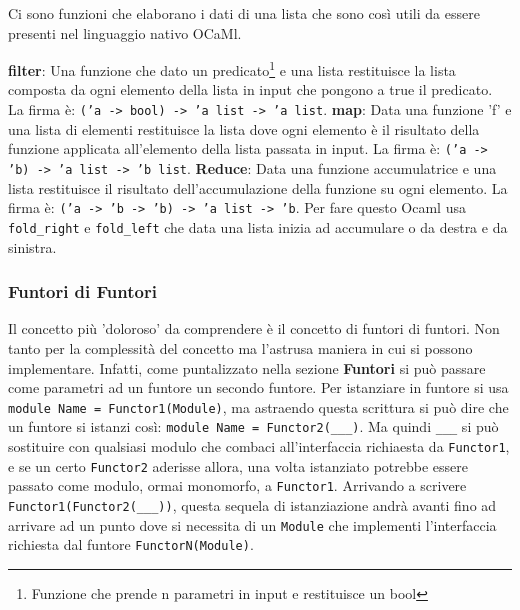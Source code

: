 \documentclass{article}
\begin{document}
\hspace*{0.5cm}Ci sono funzioni che elaborano i dati di una lista che sono così utili da essere presenti nel linguaggio nativo OCaMl.

\vspace*{0.5cm}

\hspace*{0.5cm}\textbf{filter}: Una funzione che dato un predicato\footnote{Funzione che prende n parametri in input e restituisce un bool} e una lista restituisce la lista composta da ogni elemento della lista in input che pongono a true il predicato.
La firma è: \texttt{\>('a -> bool) -> 'a list -> 'a list}.\newline
\hspace*{0.5cm}\textbf{map}: Data una funzione 'f' e una lista di elementi restituisce la lista dove ogni elemento è il risultato della funzione applicata all'elemento della lista passata in input.
La firma è: \texttt{\>('a -> 'b) -> 'a list -> 'b list}.\newline
\hspace*{0.5cm}\textbf{Reduce}: Data una funzione accumulatrice e una lista restituisce il risultato dell'accumulazione della funzione su  ogni elemento.
La firma è: \texttt{\>('a -> 'b -> 'b) -> 'a list -> 'b}.\newline
\hspace*{0.5cm}Per fare questo Ocaml usa \texttt{fold\_right} e \texttt{fold\_left} che data una lista inizia ad accumulare o da destra e da sinistra.

\subsubsection{Funtori di Funtori}

\vspace*{0.5cm}

\hspace*{0.5cm}Il concetto più 'doloroso' da comprendere è il concetto di funtori di funtori. 
Non tanto per la complessità del concetto ma l'astrusa maniera in cui si possono implementare.
Infatti, come puntalizzato nella sezione \textbf{Funtori} si può passare come parametri ad un funtore un secondo funtore.
Per istanziare in funtore si usa \texttt{module Name = Functor1(Module)}, ma astraendo questa scrittura si può dire che un funtore si istanzi così: \texttt{module Name = Functor2(\_\_\_)}.
Ma quindi \texttt{\_\_\_} si può sostituire con qualsiasi modulo che combaci all'interfaccia richiaesta da \texttt{Functor1}, e se un certo \texttt{Functor2} aderisse allora, una volta istanziato potrebbe essere passato come modulo, ormai monomorfo, a \texttt{Functor1}.
Arrivando a scrivere \texttt{Functor1(Functor2(\_\_\_))}, questa sequela di istanziazione andrà avanti fino ad arrivare ad un punto dove si necessita di un \texttt{Module} che implementi l'interfaccia richiesta dal funtore \texttt{FunctorN(Module)}.
\end{document}

